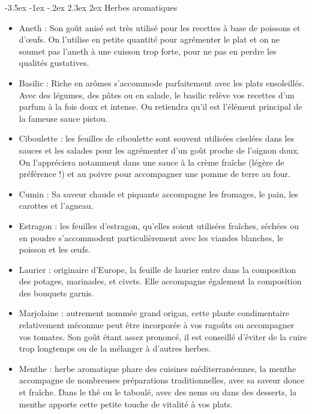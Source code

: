 \documentclass[a4paper,twoside]{report}
\makeatletter
\renewcommand{\section}{\@startsection{section}{1}{\z@}%
             {-3.5ex \@plus -1ex \@minus -.2ex}%
             {2.3ex \@plus 2ex}%
             {\normalfont\Large\scshape\bfseries\marou}}
\makeatother
\begin{document}
\section{Herbes aromatiques}
\begin{itemize}
\item Aneth : Son goût anisé est très utilisé pour les recettes à base de poissons et d’œufs. On l’utilise en petite quantité pour agrémenter le plat et on ne soumet pas l’aneth à une cuisson trop forte, pour ne pas en perdre les qualités gustatives.

\item Basilic : Riche en arômes s’accommode parfaitement avec les plats ensoleillés. Avec des légumes, des pâtes ou en salade, le basilic relève vos recettes d’un parfum à la fois doux et intense. On retiendra qu’il est l’élément principal de la fameuse sauce pistou.

\item Ciboulette : les feuilles de ciboulette sont souvent utilisées ciselées dans les sauces et les salades pour les agrémenter d’un goût proche de l’oignon doux. On l’appréciera notamment dans une sauce à la crème fraîche (légère de préférence !) et au poivre pour accompagner une pomme de terre au four.

\item Cumin : Sa saveur chaude et piquante accompagne les fromages, le pain, les carottes et l’agneau.

\item Estragon : les feuilles d’estragon, qu’elles soient utilisées fraîches, séchées ou en poudre s’accommodent particulièrement avec les viandes blanches, le poisson et les œufs.

\item Laurier : originaire d’Europe, la feuille de laurier entre dans la composition des potages, marinades, et civets. Elle accompagne également la composition des bouquets garnis.

\item Marjolaine : autrement nommée \og grand origan\fg, cette plante condimentaire relativement méconnue peut être incorporée à vos ragoûts ou accompagner vos tomates. Son goût étant assez prononcé, il est conseillé d’éviter de la cuire trop longtemps ou de la mélanger à d’autres herbes.

\item Menthe : herbe aromatique phare des cuisines méditerranéennes, la menthe accompagne de nombreuses préparations traditionnelles, avec sa saveur douce et fraîche. Dans le thé ou le taboulé, avec des nems ou dans des desserts, la menthe apporte cette petite touche de vitalité à vos plats.


\end{itemize}
\end{document}

